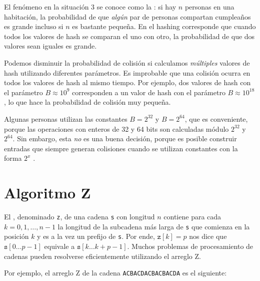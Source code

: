 
El fenómeno en la situación 3 se conoce como la : si hay $n$ personas en una habitación, la probabilidad de
que \emph{algún} par de personas compartan cumpleaños es grande incluso
si $n$ es bastante pequeña. En el hashing corresponde que cuando todos
los valores de hash se comparan el uno con otro, la probabilidad de que
dos valores sean iguales es grande.

Podemos disminuir la probabilidad de colisión si calculamos \emph{múltiples}
valores de hash utilizando diferentes parámetros. Es improbable que una
colisión ocurra en todos los valores de hash al mismo tiempo. Por ejemplo,
dos valores de hash con el parámetro $B \approx 10^9$ corresponden a un
valor de hash con el parámetro $B \approx 10^{18}$, lo que hace la
probabilidad de colisión muy pequeña.

Algunas personas utilizan las constantes $B=2^{32}$ y $B=2^{64}$, que
es conveniente, porque las operaciones con enteros de 32 y 64 bits
son calculadas módulo $2^{32}$ y $2^{64}$. Sin embargo, esta \emph{no}
es una buena decisión, porque es posible construir entradas que siempre
generan colisiones cuando se utilizan constantes con la forma
$2^x$ \cite{pac13}.

\section{Algoritmo Z}


El , denominado \texttt{z}, de una cadena \texttt{s} con
longitud $n$ contiene para cada $k=0,1,\ldots,n-1$ la longitud de la
subcadena más larga de \texttt{s} que comienza en la posición $k$ y es
a la vez un prefijo de \texttt{s}. Por ende, $\texttt{z}[k]=p$ nos dice que
$\texttt{s}[0 \ldots p-1]$ equivale a $\texttt{s}[k \ldots k+p-1]$.
Muchos problemas de procesamiento de cadenas pueden resolverse
eficientemente utilizando el arreglo Z.

Por ejemplo, el arreglo Z de la cadena
\texttt{ACBACDACBACBACDA} es el siguiente:

